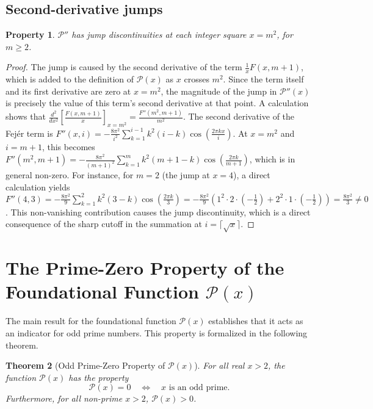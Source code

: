 \documentclass[11pt,a4paper]{amsart}
\newcommand{\Px}{\mathcal{P}}
\theoremstyle{plain}
\newtheorem{theorem}{Theorem}[section]
\newtheorem{property}[theorem]{Property}
\theoremstyle{definition}
\begin{document}
\subsection{Second-derivative jumps}
\begin{property}\label{prop:second}
$\Px''$ has jump discontinuities at each integer square $x=m^2$, for $m\ge2$.
\end{property}
\begin{proof}
The jump is caused by the second derivative of the term $\frac{1}{x}F(x, m+1)$, which is added to the definition of $\Px(x)$ as $x$ crosses $m^2$.
Since the term itself and its first derivative are zero at $x=m^2$, the magnitude of the jump in $\Px''(x)$ is precisely the value of this term's second derivative at that point.
A calculation shows that $\frac{d^2}{dx^2}\left[\frac{F(x,m+1)}{x}\right]_{x=m^2} = \frac{F''(m^2, m+1)}{m^2}$. The second derivative of the Fejér term is $F''(x, i) = -\frac{8\pi^2}{i^2}\sum_{k=1}^{i-1}k^2(i-k)\cos\left(\frac{2\pi k x}{i}\right)$.
At $x=m^2$ and $i=m+1$, this becomes $F''(m^2, m+1) = -\frac{8\pi^2}{(m+1)^2}\sum_{k=1}^{m}k^2(m+1-k)\cos\left(\frac{2\pi k}{m+1}\right)$, which is in general non-zero.
For instance, for $m=2$ (the jump at $x=4$), a direct calculation yields $F''(4, 3) = -\frac{8\pi^2}{9} \sum_{k=1}^{2}k^2(3-k)\cos\left(\frac{2\pi k}{3}\right) = -\frac{8\pi^2}{9}(1^2\cdot 2 \cdot (-\frac{1}{2}) + 2^2\cdot 1 \cdot (-\frac{1}{2})) = \frac{8\pi^2}{3} \neq 0$.
This non-vanishing contribution causes the jump discontinuity, which is a direct consequence of the sharp cutoff in the summation at $i = \lceil\sqrt{x}\rceil$.
\end{proof}

\section{The Prime-Zero Property of the Foundational Function $\Px(x)$}

The main result for the foundational function $\Px(x)$ establishes that it acts as an indicator for odd prime numbers.
This property is formalized in the following theorem.

\begin{theorem}[Odd Prime-Zero Property of $\Px(x)$]\label{thm:primezero}
For all real $x>2$, the function $\Px(x)$ has the property
\[
\Px(x)=0 \quad\Longleftrightarrow\quad x \text{ is an odd prime}.
\]
Furthermore, for all non-prime $x>2$, $\Px(x) > 0$.
\end{theorem}
\end{document}

